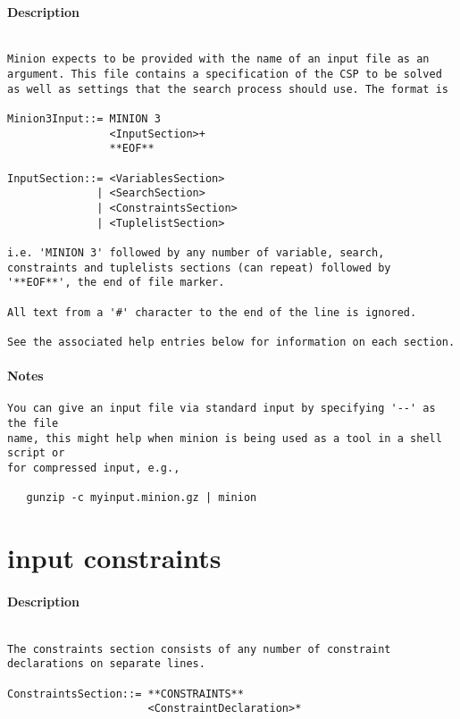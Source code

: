 \paragraph{Description}
{\footnotesize
\begin{verbatim}

Minion expects to be provided with the name of an input file as an
argument. This file contains a specification of the CSP to be solved
as well as settings that the search process should use. The format is

Minion3Input::= MINION 3
                <InputSection>+
                **EOF**

InputSection::= <VariablesSection> 
              | <SearchSection>
              | <ConstraintsSection> 
              | <TuplelistSection>

i.e. 'MINION 3' followed by any number of variable, search,
constraints and tuplelists sections (can repeat) followed by
'**EOF**', the end of file marker.

All text from a '#' character to the end of the line is ignored.

See the associated help entries below for information on each section.
\end{verbatim}
}
\paragraph{Notes}
{\footnotesize
\begin{verbatim}
You can give an input file via standard input by specifying '--' as the file
name, this might help when minion is being used as a tool in a shell script or
for compressed input, e.g.,

   gunzip -c myinput.minion.gz | minion
\end{verbatim}
}
\section{input constraints}
\paragraph{Description}
{\footnotesize
\begin{verbatim}

The constraints section consists of any number of constraint
declarations on separate lines.

ConstraintsSection::= **CONSTRAINTS**
                      <ConstraintDeclaration>*
\end{verbatim}
}
